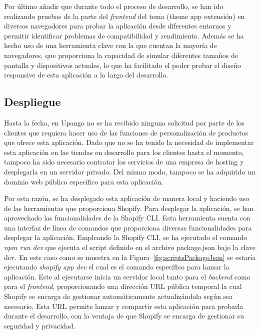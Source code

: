 \documentclass[12pt]{article}
\begin{document}
Por último añadir que durante todo el proceso de desarrollo, se han ido realizando pruebas de la parte del \textit{frontend} del tema (theme app extensión) en diversos
navegadores para probar la aplicación desde diferentes entornos y permitir identificar problemas de compatibilidad y rendimiento.
Además se ha hecho uso de una herramienta clave con la que cuentan la mayoría de navegadores, que proporciona la capacidad de simular diferentes 
tamaños de pantalla y dispositivos actuales, lo que ha facilitado el poder probar el diseño responsive de esta aplicación a lo largo del desarrollo.

\subsection{Despliegue}
Hasta la fecha, en Upango no se ha recibido ninguna solicitud por parte de los clientes que requiera hacer uso de las funciones de personalización de productos
que ofrece esta aplicación. Dado que no se ha tenido la necesidad de implementar esta aplicación en las tiendas en desarrollo para los clientes hasta el momento, tampoco ha sido 
necesario contratar los servicios de una empresa de hosting y desplegarla en un servidor privado. Del mismo modo, tampoco se ha adquirido un dominio web público 
específico para esta aplicación.

Por esta razón, se ha desplegado esta aplicación de manera local y haciendo uso de las herramientas que proporciona Shopify. Para desplegar la aplicación,
se han aprovechado las funcionalidades de la Shopify CLI. Esta herramienta cuenta con una interfaz de línea de comandos que proporciona diversas funcionalidades para desplegar la aplicación.
Empleando la Shopify CLI, se ha ejecutado el comando \textit{npm run dev} que ejecuta el script definido en el archivo package.json bajo la clave dev. En este caso como se muestra en la Figura~\ref{fig:scriptsPackageJson} se estaría ejecutando \textit{shopify app dev} el cual es el comando específico para lanzar la aplicación.
Este al ejecutarse inicia un servidor local tanto para el \textit{backend} como para el \textit{frontend}, proporcionando
una dirección URL pública temporal la cual Shopify se encarga de gestionar automáticamente actualizándola según sea necesario. Esta URL permite lanzar y compartir esta aplicación para probarla durante el desarrollo, con la ventaja de que 
Shopify se encarga de gestionar su seguridad y privacidad.
\end{document}
